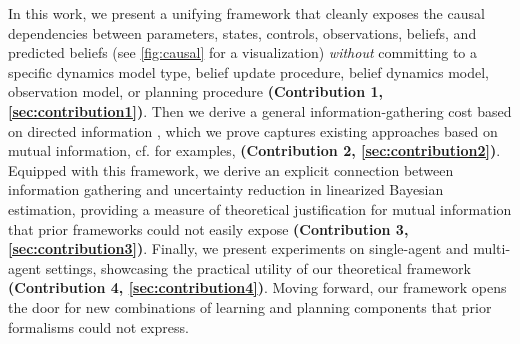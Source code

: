 In this work, we present a unifying framework that cleanly exposes the causal dependencies between parameters, states, controls, observations, beliefs, and predicted beliefs (see \cref{fig:causal} for a visualization) \textit{without} committing to a specific dynamics model type, belief update procedure, belief dynamics model, observation model, or planning procedure \textbf{(Contribution 1, \cref{sec:contribution1})}.
Then we derive a general information-gathering cost based on directed information \cite{massey1990causality}, which we prove captures existing approaches based on mutual information, cf. \cite{sukhija2023optimistic, buisson2020actively,lew2022safe,krause2007nonmyopic,zimmer2018safe,abraham2019active,vantilborgh2025dual,davydov2024first, palafox2025info} for examples, \textbf{(Contribution 2, \cref{sec:contribution2})}.
Equipped with this framework, we derive an explicit connection between information gathering and uncertainty reduction in linearized Bayesian estimation, providing a measure of theoretical justification for mutual information that prior frameworks could not easily expose 
\textbf{(Contribution 3, \cref{sec:contribution3})}.
Finally, we present experiments on single-agent and multi-agent settings, showcasing the practical utility of our theoretical framework \textbf{(Contribution 4, \cref{sec:contribution4})}.
Moving forward, our framework opens the door for new combinations of learning and planning components that prior formalisms could not express.